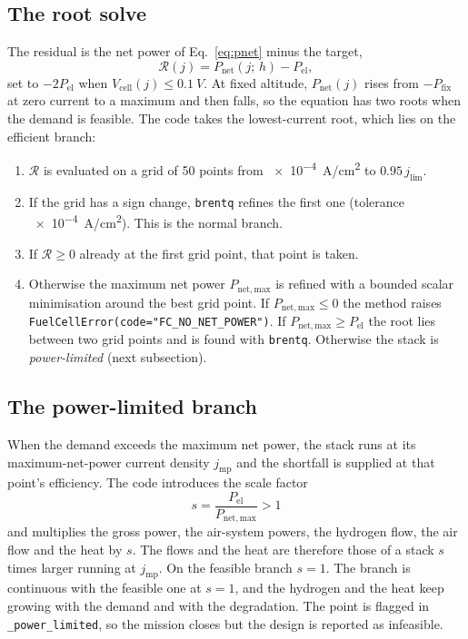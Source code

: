 \documentclass[a4paper,11pt]{article}
\newcommand{\code}[1]{\nolinkurl{#1}}
\newcommand{\fn}[1]{\nolinkurl{#1}}
\newcommand{\Pel}{P_\mathrm{el}}
\begin{document}
\subsection{The root solve}

The residual is the net power of Eq.~\eqref{eq:pnet} minus the target,
\begin{equation}
  \mathcal R(j) = P_\mathrm{net}(j;\,h) - \Pel ,
\end{equation}
set to $-2\Pel$ when $V_\mathrm{cell}(j)\le\SI{0.1}{V}$. At fixed altitude, $P_\mathrm{net}(j)$
rises from $-P_\mathrm{fix}$ at zero current to a maximum and then falls, so the equation has
two roots when the demand is feasible. The code takes the lowest-current root, which lies on
the efficient branch:
\begin{enumerate}
  \item $\mathcal R$ is evaluated on a grid of 50 points from \SI{e-4}{A/cm^2} to
  $0.95\,j_\mathrm{lim}$.
  \item If the grid has a sign change, \fn{brentq} refines the first one (tolerance
  \SI{e-4}{A/cm^2}). This is the normal branch.
  \item If $\mathcal R\ge0$ already at the first grid point, that point is taken.
  \item Otherwise the maximum net power $P_\mathrm{net,max}$ is refined with a bounded scalar
  minimisation around the best grid point. If $P_\mathrm{net,max}\le0$ the method raises
  \code{FuelCellError(code="FC_NO_NET_POWER")}. If $P_\mathrm{net,max}\ge\Pel$ the root lies
  between two grid points and is found with \fn{brentq}. Otherwise the stack is
  \emph{power-limited} (next subsection).
\end{enumerate}

\subsection{The power-limited branch}
\label{sec:powerlimited}

When the demand exceeds the maximum net power, the stack runs at its maximum-net-power current
density $j_\mathrm{mp}$ and the shortfall is supplied at that point's efficiency. The code
introduces the scale factor
\begin{equation}
  s = \frac{\Pel}{P_\mathrm{net,max}} > 1
\end{equation}
and multiplies the gross power, the air-system powers, the hydrogen flow, the air flow and the
heat by $s$. The flows and the heat are therefore those of a stack $s$ times larger running at
$j_\mathrm{mp}$. On the feasible branch $s=1$. The branch is continuous with the feasible one
at $s=1$, and the hydrogen and the heat keep growing with the demand and with the degradation.
The point is flagged in
\code{_power_limited}, so the mission closes but the design is reported as infeasible.
\end{document}
